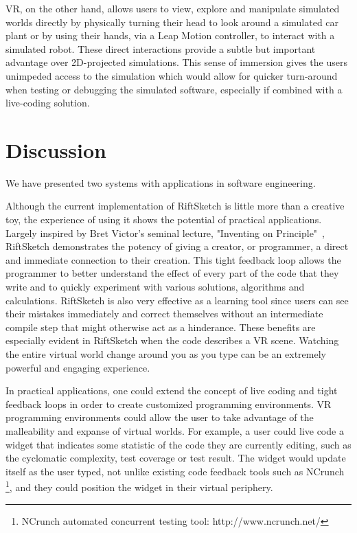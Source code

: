 \documentclass[conference]{IEEEtran}
\begin{document}
VR, on the other hand, allows users to view, explore and manipulate simulated worlds directly by physically turning their head to look around a simulated car plant or by using their hands, via a Leap Motion controller, to interact with a simulated robot. 
These direct interactions provide a subtle but important advantage over 2D-projected simulations. 
This sense of immersion gives the users unimpeded access to the simulation which would allow for quicker turn-around when testing or debugging the simulated software, especially if combined with a live-coding solution.

\section{Discussion}
We have presented two systems with applications in software engineering.

Although the current implementation of RiftSketch is little more than a creative toy, the experience of using it shows the potential of practical applications. 
Largely inspired by Bret Victor's seminal lecture, "Inventing on Principle"~\cite{Victor:InventingOnPrincipleVideo}\cite{Victor:InventingOnPrincipleTranscript}, RiftSketch demonstrates the potency of giving a creator, or programmer, a direct and immediate connection to their creation. 
This tight feedback loop allows the programmer to better understand the effect of every part of the code that they write and to quickly experiment with various solutions, algorithms and calculations. 
RiftSketch is also very effective as a learning tool since users can see their mistakes immediately and correct themselves without an intermediate compile step that might otherwise act as a hinderance.  
These benefits are especially evident in RiftSketch when the code describes a VR scene. 
Watching the entire virtual world change around you as you type can be an extremely powerful and engaging experience.

In practical applications, one could extend the concept of live coding and tight feedback loops in order to create customized programming environments. 
VR programming environments could allow the user to take advantage of the malleability and expanse of virtual worlds. 
For example, a user could live code a widget that indicates some statistic of the code they are currently editing, such as the cyclomatic complexity, test coverage or test result. 
The widget would update itself as the user typed, not unlike existing code feedback tools such as NCrunch \footnote{NCrunch automated concurrent testing tool: http://www.ncrunch.net/}, and they could position the widget in their virtual periphery.
\end{document}

